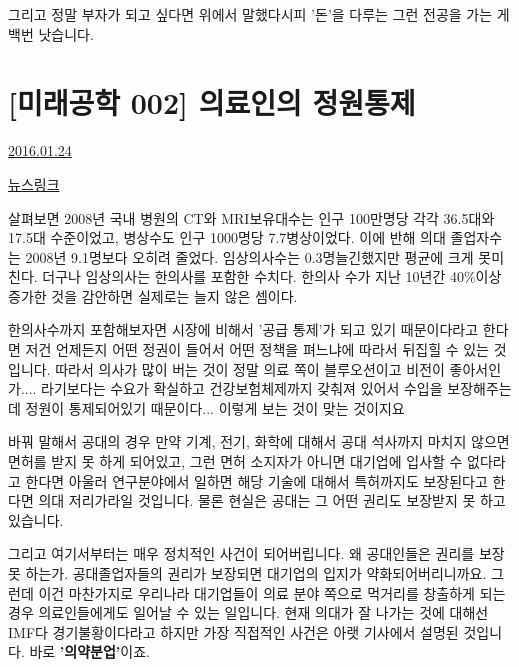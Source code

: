 그리고 정말 부자가 되고 싶다면 위에서 말했다시피 '돈'을 다루는 그런 전공을 가는 게 백번 낫습니다.
\vspace{5mm}






\section{[미래공학 002] 의료인의 정원통제}
\href{https://www.kockoc.com/Apoc/607568}{2016.01.24}

\vspace{5mm}

\href{http://www.newspim.com/news/view/20150916000272}{뉴스링크}
\vspace{5mm}

살펴보면 2008년 국내 병원의 CT와 MRI보유대수는 인구 100만명당 각각 36.5대와 17.5대 수준이었고, 병상수도 인구 1000명당 7.7병상이었다. 이에 반해 의대 졸업자수는 2008년 9.1명보다 오히려 줄었다. 임상의사수는 0.3명늘긴했지만 평균에 크게 못미친다. 더구나 임상의사는 한의사를 포함한 수치다. 한의사 수가 지난 10년간 40$\%$이상 증가한 것을 감안하면 실제로는 늘지 않은 셈이다.
\vspace{5mm}

한의사수까지 포함해보자면 시장에 비해서 '공급 통제'가 되고 있기 때문이다라고 한다면
저건 언제든지 어떤 정권이 들어서 어떤 정책을 펴느냐에 따라서 뒤집힐 수 있는 것입니다.
따라서 의사가 많이 버는 것이 정말 의료 쪽이 블루오션이고 비전이 좋아서인가.... 라기보다는
수요가 확실하고 건강보험체제까지 갖춰져 있어서 수입을 보장해주는데 정원이 통제되어있기 때문이다...
이렇게 보는 것이 맞는 것이지요
\vspace{5mm}

바꿔 말해서 공대의 경우 만약 기계, 전기, 화학에 대해서 공대 석사까지 마치지 않으면 면허를 받지 못 하게 되어있고,
그런 면허 소지자가 아니면 대기업에 입사할 수 없다라고 한다면
아울러 연구분야에서 일하면 해당 기술에 대해서 특허까지도 보장된다고 한다면
의대 저리가라일 것입니다. 물론 현실은 공대는 그 어떤 권리도 보장받지 못 하고 있습니다.
\vspace{5mm}

그리고 여기서부터는 매우 정치적인 사건이 되어버립니다.
왜 공대인들은 권리를 보장 못 하는가. 공대졸업자들의 권리가 보장되면 대기업의 입지가 약화되어버리니까요.
그런데 이건 마찬가지로 우리나라 대기업들이 의료 분야 쪽으로 먹거리를 창출하게 되는 경우 의료인들에게도 일어날 수 있는 일입니다.
현재 의대가 잘 나가는 것에 대해선 IMF다 경기불황이다라고 하지만
가장 직접적인 사건은 아랫 기사에서 설명된 것입니다. 바로 \textbf{'의약분업'}이죠.
\vspace{5mm}

